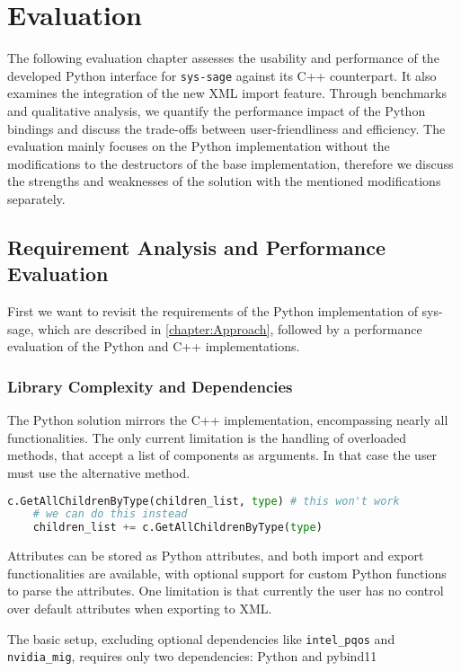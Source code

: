 \chapter{Evaluation}\label{chapter:Evaluation}

The following evaluation chapter assesses the usability and performance of the developed Python interface for \texttt{sys-sage} against its C++ counterpart. It also examines the integration of the new XML import feature. Through benchmarks and qualitative analysis, we quantify the performance impact of the Python bindings and discuss the trade-offs between user-friendliness and efficiency. The evaluation mainly focuses on the Python implementation without the modifications to the destructors of the base implementation, therefore we discuss the strengths and weaknesses of the solution with the mentioned modifications separately.

\section{Requirement Analysis and Performance Evaluation}
First we want to revisit the requirements of the Python implementation of sys-sage, which are described in \autoref{chapter:Approach}, followed by a performance evaluation of the Python and C++ implementations.
\subsection{Library Complexity and Dependencies}

The Python solution mirrors the C++ implementation, encompassing nearly all functionalities. The only current limitation is the handling of overloaded methods, that accept a list of components as arguments. In that case the user must use the alternative method. 
\begin{lstlisting}[language=Python, xleftmargin=4em, frame = single]
    c.GetAllChildrenByType(children_list, type) # this won't work
    # we can do this instead 
    children_list += c.GetAllChildrenByType(type)
    \end{lstlisting}

Attributes can be stored as Python attributes, and both import and export functionalities are available, with optional support for custom Python functions to parse the attributes. One limitation is that currently the user has no control over default attributes when exporting to XML. 

The basic setup, excluding optional dependencies like \texttt{intel\_pqos} and \texttt{nvidia\_mig}, requires only two dependencies: Python and pybind11

